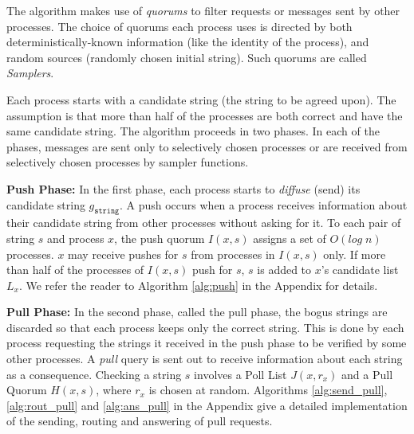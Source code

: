 The algorithm makes use of \textit{quorums} to filter requests or messages sent by other processes. The choice of quorums each process uses is directed by both deterministically-known information (like the identity of the process), and random sources (randomly chosen initial string). Such quorums are called \textit{Samplers}.


Each process starts with a candidate string (the string to be agreed upon). The assumption is that more than half of the processes are both correct and have the same candidate string. The algorithm proceeds in two phases. In each of the phases, messages are sent only to selectively chosen processes or are received from selectively chosen processes by sampler functions.

\textbf{Push Phase:} In the first phase, each process starts to \textit{diffuse} (send) its candidate string $g_{\mathtt{string}}$. A push occurs when a process receives information about their candidate string from other processes without asking for it. To each pair of string $s$ and process $x$, the push quorum $I(x,s)$ assigns a set of $O(log\;n)$ processes. $x$ may receive pushes for $s$ from processes in $I(x,s)$ only. If more than half of the processes of $I(x,s)$ push for $s$, $s$ is added to $x$'s candidate list $L_x$. 
We refer the reader to Algorithm \ref{alg:push} in the Appendix for details.
 
\textbf{Pull Phase:} In the second phase, called the pull phase, the bogus strings are discarded so that each process keeps only the correct string. This is done by each process requesting the strings it received in the push phase to be verified by some other processes. A \textit{pull} query is sent out to receive information about each string as a consequence. Checking a string $s$ involves a Poll List $J(x, r_x)$ and a Pull Quorum $H(x, s)$, where $r_x$ is chosen at random. 
Algorithms \ref{alg:send_pull}, \ref{alg:rout_pull} and \ref{alg:ans_pull} in the Appendix give a detailed implementation of the sending, routing and answering of pull requests.

